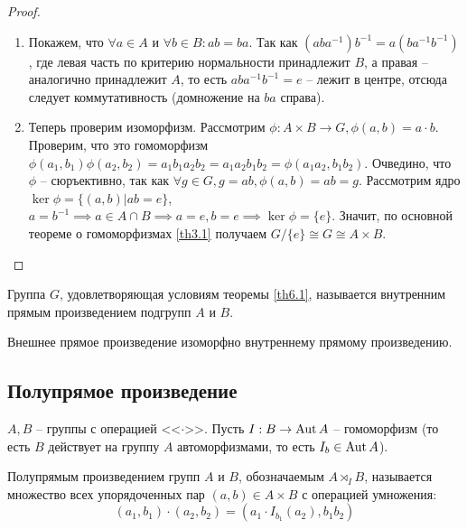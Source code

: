 \begin{proof}
    \begin{enumerate}
        \item Покажем, что $\forall a \in A$ и $\forall b \in B: ab = ba$.
        Так как $(aba^{-1})b^{-1} = a(ba^{-1}b^{-1})$, где левая часть по критерию нормальности принадлежит $B$, а правая -- аналогично принадлежит $A$, то есть $aba^{-1}b^{-1} = e$ -- лежит в центре, отсюда следует коммутативность (домножение на $ba$ справа).
        \item Теперь проверим изоморфизм. Рассмотрим $\phi: A \times B \to G, \phi(a, b) = a \cdot b$. Проверим, что это гомоморфизм $\phi(a_1, b_1)\phi(a_2, b_2) = a_1b_1a_2b_2 = a_1a_2b_1b_2 = \phi (a_1a_2, b_1b_2)$. Очведино, что $\phi$ -- сюръективно, так как $\forall g \in G, g = ab, \phi(a, b) = ab = g$. Рассмотрим ядро $\ker \phi = \{ (a, b) | ab = e \}$, $a = b^{-1} \implies a \in A \cap B \implies a = e, b = e \implies \ker \phi = \{ e \}$. Значит, по основной теореме о гомоморфизмах \ref{th3.1} получаем $G/ \{ e \} \cong G \cong A \times B$.
    \end{enumerate}
\end{proof}

\begin{definition}
    Группа $G$, удовлетворяющая условиям теоремы \ref{th6.1}, называется внутренним прямым произведением подгрупп $A$ и $B$.
\end{definition}

\begin{corollary}
    Внешнее прямое произведение изоморфно внутреннему прямому произведению.
\end{corollary}

\subsection{Полупрямое произведение}

$A, B$ -- группы с операцией <<$\cdot$>>. Пусть $I: B \to \operatorname{Aut} A$ -- гомоморфизм (то есть $B$ действует на группу $A$ автоморфизмами, то есть $I_b \in \operatorname{Aut} A$).
\begin{definition}
    Полупрямым произведением групп $A$ и $B$, обозначаемым $A \rtimes_I B$, называется множество всех упорядоченных пар $(a, b) \in A \times B$ с операцией умножения:
    $$(a_1, b_1) \cdot (a_2, b_2) = (a_1 \cdot I_{b_1}(a_2), b_1b_2)$$
\end{definition}

